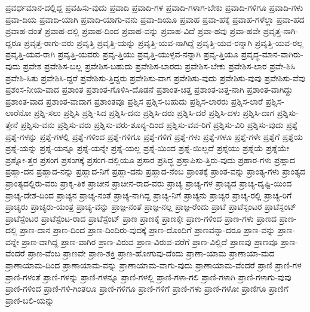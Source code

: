 {ಪ್ರವರ್ಧಮಾನ-ದಲ್ಲಿದ್ದ
ಪ್ರವಹಿಸು-ವುದು
ಪ್ರವಾದಿ
ಪ್ರವಾದಿ-ಗಳ
ಪ್ರವಾದಿ-ಗಳಾಗ-ಬೇಕು
ಪ್ರವಾದಿ-ಗಳಿಗೂ
ಪ್ರವಾದಿ-ಗಳು
ಪ್ರವಾ-ದಿಯ
ಪ್ರವಾದಿ-ಯಾಗಿ
ಪ್ರವಾದಿ-ಯಾಗು-ವನು
ಪ್ರವಾ-ದಿಯೂ
ಪ್ರವಾಹ
ಪ್ರವಾ-ಹಕ್ಕೆ
ಪ್ರವಾಹ-ಗಳೆಲ್ಲಾ
ಪ್ರವಾ-ಹದ
ಪ್ರವಾಹ-ದಂತೆ
ಪ್ರವಾಹ-ದಲ್ಲಿ
ಪ್ರವಾಹ-ದಿಂದ
ಪ್ರವಾಹ-ವನ್ನು
ಪ್ರವಾಹ-ವಿದೆ
ಪ್ರವಾ-ಹವು
ಪ್ರವಾ-ಹವೇ
ಪ್ರವೃತ್ತ-ನಾಗಿ-ದ್ದರೂ
ಪ್ರವೃತ್ತ-ರಾಗು-ವರು
ಪ್ರವೃತ್ತಿ
ಪ್ರವೃತ್ತಿ-ಯನ್ನು
ಪ್ರವೃತ್ತಿ-ಯವ-ನಾಗಿದ್ದೆ
ಪ್ರವೃತ್ತಿ-ಯವ-ರನ್ನಾಗಿ
ಪ್ರವೃತ್ತಿ-ಯವ-ರಲ್ಲ
ಪ್ರವೃತ್ತಿ-ಯವ-ರಾಗಿ
ಪ್ರವೃತ್ತಿ-ಯವರು
ಪ್ರವೃ-ತ್ತಿಯು
ಪ್ರವೃತ್ತಿ-ಯುಳ್ಳವ-ನನ್ನಾಗಿ
ಪ್ರವೃ-ತ್ತಿಯೂ
ಪ್ರವೃದ್ಧ-ಮಾನ-ವಾಗಿರು-ವುದು
ಪ್ರವೇಶ
ಪ್ರವೇಶಿಸ-ಬಲ್ಲ
ಪ್ರವೇಶಿಸ-ಬಹುದು
ಪ್ರವೇಶಿಸ-ಬಾರದು
ಪ್ರವೇಶಿಸ-ಬೇಕು
ಪ್ರವೇಶಿಸ-ಲಾರ
ಪ್ರವೇ-ಶಿಸಿ
ಪ್ರವೇಶಿ-ಸಿತು
ಪ್ರವೇಶಿಸಿ-ದ್ದರೆ
ಪ್ರವೇಶಿಸು-ತ್ತಿದ್ದರು
ಪ್ರವೇಶಿಸು-ವಾಗ
ಪ್ರವೇಶಿಸು-ವುದು
ಪ್ರವೇಶಿಸು-ವುವು
ಪ್ರವೇಶಿಸು-ವೆವು
ಪ್ರಶಂಸ-ನೀಯ-ವಾದ
ಪ್ರಶಾಂತ
ಪ್ರಶಾಂತ-ಗೊಳಿಸಿ-ದೊಡನೆ
ಪ್ರಶಾಂತ-ಚಿತ್ತ
ಪ್ರಶಾಂತ-ಚಿತ್ತ-ನಾಗಿ
ಪ್ರಶಾಂತ-ವಾಗಿದ್ದು
ಪ್ರಶಾಂತ-ವಾದ
ಪ್ರಶಾಂತ-ವಾದಾಗ
ಪ್ರಶಾಂತವೂ
ಪ್ರಶ್ನಿಸ
ಪ್ರಶ್ನಿಸ-ಬಹುದು
ಪ್ರಶ್ನಿಸ-ಲಾರರು
ಪ್ರಶ್ನಿಸ-ಲಾರೆ
ಪ್ರಶ್ನಿಸ-ಲಾರೆನೋ
ಪ್ರಶ್ನಿ-ಸಲು
ಪ್ರಶ್ನಿಸಿ
ಪ್ರಶ್ನಿ-ಸಿದ
ಪ್ರಶ್ನಿಸಿ-ದನು
ಪ್ರಶ್ನಿಸಿ-ದರು
ಪ್ರಶ್ನಿಸಿ-ದರೆ
ಪ್ರಶ್ನಿಸಿ-ದಳು
ಪ್ರಶ್ನಿಸಿ-ದಾಗ
ಪ್ರಶ್ನಿಸು-ತ್ತೇನೆ
ಪ್ರಶ್ನಿಸು-ವನು
ಪ್ರಶ್ನಿಸು-ವರು
ಪ್ರಶ್ನಿಸು-ವರು-ಶೂನ್ಯ-ದಿಂದ
ಪ್ರಶ್ನಿಸು-ವವ-ರಿಗೆ
ಪ್ರಶ್ನಿಸು-ವಿರಿ
ಪ್ರಶ್ನಿಸು-ವುದು
ಪ್ರಶ್ನೆ
ಪ್ರಶ್ನೆ-ಗಳನ್ನು
ಪ್ರಶ್ನೆ-ಗಳಲ್ಲಿ
ಪ್ರಶ್ನೆ-ಗಳಿಂದ
ಪ್ರಶ್ನೆ-ಗಳಿಗೂ
ಪ್ರಶ್ನೆ-ಗಳಿಗೆ
ಪ್ರಶ್ನೆ-ಗಳು
ಪ್ರಶ್ನೆ-ಗಳೂ
ಪ್ರಶ್ನೆ-ಗಳೇ
ಪ್ರಶ್ನೆಗೆ
ಪ್ರಶ್ನೆಯ
ಪ್ರಶ್ನೆ-ಯನ್ನು
ಪ್ರಶ್ನೆ-ಯನ್ನೂ
ಪ್ರಶ್ನೆ-ಯನ್ನೇ
ಪ್ರಶ್ನೆ-ಯಲ್ಲ
ಪ್ರಶ್ನೆ-ಯಿಂದ
ಪ್ರಶ್ನೆ-ಯಿಲ್ಲದೆ
ಪ್ರಶ್ನೆಯು
ಪ್ರಶ್ನೆಯೆ
ಪ್ರಶ್ನೆಯೇ
ಪ್ರಶ್ನೋ-ತ್ತರ
ಪ್ರಸಂಗ
ಪ್ರಸಂಗಕ್ಕೆ
ಪ್ರಸಂಗ-ದಲ್ಲಿಯೂ
ಪ್ರಸಾರ
ಪ್ರಸಿದ್ಧ
ಪ್ರಸ್ತಾಪಿಸು-ತ್ತಿರು-ವುದು
ಪ್ರಹಾರ-ಗಳು
ಪ್ರಹ್ಲಾದ
ಪ್ರಹ್ಲಾ-ದನ
ಪ್ರಹ್ಲಾದ-ನನ್ನು
ಪ್ರಹ್ಲಾದ-ನಿಗೆ
ಪ್ರಹ್ಲಾ-ದನು
ಪ್ರಹ್ಲಾದ-ನೆಂಬ
ಪ್ರಾಂತಕ್ಕೆ
ಪ್ರಾಂತ-ವನ್ನು
ಪ್ರಾಂತ್ಯ-ಗಳು
ಪ್ರಾಂತ್ಯದ
ಪ್ರಾಂತ್ಯದಲ್ಲಿರು-ವರು
ಪ್ರಾಕೃ-ತಿಕ
ಪ್ರಾಚೀನ
ಪ್ರಾಚೀನ-ರಾದ-ವರು
ಪ್ರಾಚ್ಯ
ಪ್ರಾಚ್ಯ-ಗಳ
ಪ್ರಾಚ್ಯದ
ಪ್ರಾಚ್ಯ-ದೃಷ್ಟಿ-ಯಿಂದ
ಪ್ರಾಚ್ಯ-ದೇಶ-ದಿಂದ
ಪ್ರಾಚ್ಯನ
ಪ್ರಾಚ್ಯ-ನಂತೆ
ಪ್ರಾಚ್ಯ-ನಾಗಿದ್ದ
ಪ್ರಾಚ್ಯ-ನಿಗೆ
ಪ್ರಾಚ್ಯನು
ಪ್ರಾಚ್ಯರ
ಪ್ರಾಚ್ಯ-ರಲ್ಲಿ
ಪ್ರಾಚ್ಯ-ರಿಗೆ
ಪ್ರಾಚ್ಯರು
ಪ್ರಾಚ್ಯರು-ಯಂತ್ರ
ಪ್ರಾಚ್ಯ-ವನ್ನು
ಪ್ರಾಜ್ಞ-ನಂತೆ
ಪ್ರಾಜ್ಞ-ನಲ್ಲ
ಪ್ರಾಜ್ಞ-ರೆಂದು
ಪ್ರಾಟೆ
ಪ್ರಾಟೆಸ್ಟಂಟರ
ಪ್ರಾಟೆಸ್ಟಂಟ್
ಪ್ರಾಟೆಸ್ಟೆಂಟರ
ಪ್ರಾಟೆಸ್ಟೆಂಟ-ರಾದ
ಪ್ರಾಟೆಸ್ಟೆಂಟ್
ಪ್ರಾಣ
ಪ್ರಾಣಕ್ಕೆ
ಪ್ರಾಣಕ್ಕೇ
ಪ್ರಾಣ-ಗಳಿಂದ
ಪ್ರಾಣ-ಗಳು
ಪ್ರಾಣದ
ಪ್ರಾಣ-ದಲ್ಲಿ
ಪ್ರಾಣ-ದಾನ
ಪ್ರಾಣ-ದಿಂದ
ಪ್ರಾಣ-ದಿಂದಿರು-ವುದಕ್ಕೆ
ಪ್ರಾಣ-ದೊಂದಿಗೆ
ಪ್ರಾಣವನ್ನಾ-ದರೂ
ಪ್ರಾಣ-ವನ್ನು
ಪ್ರಾಣ-ವನ್ನೇ
ಪ್ರಾಣ-ವಾಗಿದ್ದ
ಪ್ರಾಣ-ವಾಗಿರ
ಪ್ರಾಣ-ವಿರುವ
ಪ್ರಾಣ-ವಿರುವ-ವರೆಗೆ
ಪ್ರಾಣ-ವಿಲ್ಲಿದೆ
ಪ್ರಾಣವು
ಪ್ರಾಣವೂ
ಪ್ರಾಣ-ವೆಂದರೆ
ಪ್ರಾಣ-ವೆಂಬ
ಪ್ರಾಣವೇ
ಪ್ರಾಣ-ಶಕ್ತಿ
ಪ್ರಾಣ-ಹೋಗುವು-ದೆಂದು
ಪ್ರಾಣಾ-ಯಾಮ
ಪ್ರಾಣಾಯಾ-ಮದ
ಪ್ರಾಣಾಯಾಮ-ದಿಂದ
ಪ್ರಾಣಾಯಾಮ-ವನ್ನು
ಪ್ರಾಣಾಯಾಮ-ವಾಗು-ವುದು
ಪ್ರಾಣಾಯಾಮ-ವೆಂದರೆ
ಪ್ರಾಣಿ
ಪ್ರಾಣಿ-ಗಳ
ಪ್ರಾಣಿ-ಗಳಂತೆ
ಪ್ರಾಣಿ-ಗಳನ್ನು
ಪ್ರಾಣಿ-ಗಳನ್ನೂ
ಪ್ರಾಣಿ-ಗಳಲ್ಲಿ
ಪ್ರಾಣಿ-ಗಳಾ-ಗಲಿ
ಪ್ರಾಣಿ-ಗಳಾಗಿ
ಪ್ರಾಣಿ-ಗಳಾಗು-ವುವು
ಪ್ರಾಣಿ-ಗಳಿಂದ
ಪ್ರಾಣಿ-ಗಳಿ-ಗಿಂತಲೂ
ಪ್ರಾಣಿ-ಗಳಿಗೂ
ಪ್ರಾಣಿ-ಗಳಿಗೆ
ಪ್ರಾಣಿ-ಗಳು
ಪ್ರಾಣಿ-ಗಳೋ
ಪ್ರಾಣಿಗೂ
ಪ್ರಾಣಿಗೆ
ಪ್ರಾಣಿ-ಬಲಿ-ಯನ್ನು
}
